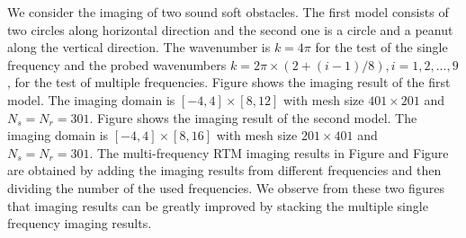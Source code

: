 \documentclass[11pt]{iopart}
\begin{document}
\begin{exmp}
{\rm We consider the imaging of two sound soft obstacles. The first model consists of two circles along
horizontal direction and the second one is a circle and a peanut along the vertical direction.
The wavenumber is $k=4\pi$ for the test of the single frequency and the probed wavenumbers $k=2\pi\times(2+(i-1)/8), i=1,2,...,9$, for the test of multiple frequencies.
Figure  shows the imaging result of the first model. The imaging domain is $[-4,4]\times[8,12]$
with mesh size $401\times 201$ and $N_s=N_r=301$.
Figure  shows the imaging result of the second model. The imaging domain is $[-4,4]\times[8,16]$
with mesh size $201\times 401$ and $N_s=N_r=301$. The multi-frequency RTM imaging results in Figure  and
Figure  are obtained by adding the imaging results from different frequencies and then dividing the number of the used frequencies. 
We observe from these two figures that imaging results can be greatly improved by stacking the multiple single frequency imaging results.}
\end{exmp}




\end{document}
